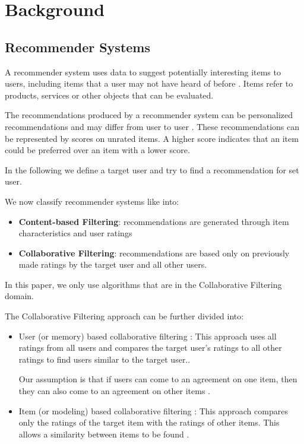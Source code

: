 \chapter{Background}

\label{chap:background}

\section{Recommender Systems}

\label{sec:background_recommend}

A recommender system uses data to suggest potentially interesting items to users, including items that a user may not have heard of before \cite{LU20121}. Items refer to products, services or other objects that can be evaluated. 

The recommendations produced by a recommender system can be personalized recommendations and may differ from user to user \cite{LU20121}. These recommendations can be represented by scores on unrated items. A higher score indicates that an item could be preferred over an item with a lower score.

In the following we define a target user and try to find a recommendation for set user.

We now classify recommender systems like \cite{LU20121, itemColFiltRecom} into:

\begin{itemize}
    \item \textbf{Content-based Filtering}: recommendations are generated through item characteristics and user ratings
    \item \textbf{Collaborative Filtering}: recommendations are based only on previously made ratings by the target user and all other users. 
\end{itemize}

In this paper, we only use algorithms that are in the Collaborative Filtering domain. 

The Collaborative Filtering approach can be further divided into:

\begin{itemize}
    \item User (or memory) based collaborative filtering \cite{itemColFiltRecom, LU20121}: This approach uses all ratings from all users and compares the target user's ratings to all other ratings to find users similar to the target user.\cite{itemColFiltRecom}. 

Our assumption is that if users can come to an agreement on one item, then they can also come to an agreement on other items \cite{LU20121}.
    \item Item (or modeling) based collaborative filtering \cite{itemColFiltRecom, LU20121}: This approach compares only the ratings of the target item with the ratings of other items. This allows a similarity between items to be found \cite{itemColFiltRecom}.
\end{itemize}

